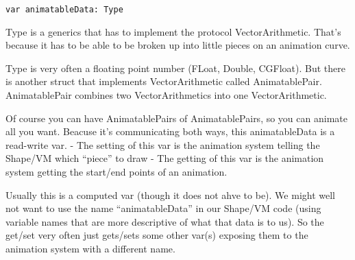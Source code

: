 \documentclass[]{article}
\begin{document}
\begin{verbatim}
var animatableData: Type
\end{verbatim}

Type is a generics that has to implement the protocol VectorArithmetic.
That's because it has to be able to be broken up into little pieces on
an animation curve.

Type is very often a floating point number (FLoat, Double, CGFloat). But
there is another struct that implements VectorArithmetic called
AnimatablePair. AnimatablePair combines two VectorArithmetics into one
VectorArithmetic.

Of course you can have AnimatablePairs of AnimatablePairs, so you can
animate all you want. Beacuse it's communicating both ways, this
animatableData is a read-write var. - The setting of this var is the
animation system telling the Shape/VM which ``piece'' to draw - The
getting of this var is the animation system getting the start/end points
of an animation.

Usually this is a computed var (though it does not ahve to be). We might
well not want to use the name ``animatableData'' in our Shape/VM code
(using variable names that are more descriptive of what that data is to
us). So the get/set very often just gets/sets some other var(s) exposing
them to the animation system with a different name.
\end{document}
